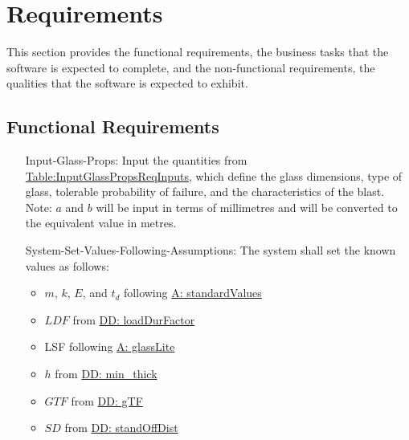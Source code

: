 \documentclass[12pt]{article}
\begin{document}
\section{Requirements}
\label{Sec:Requirements}
This section provides the functional requirements, the business tasks that the software is expected to complete, and the non-functional requirements, the qualities that the software is expected to exhibit.
\subsection{Functional Requirements}
\label{Sec:FRs}
\begin{itemize}
\item[Input-Glass-Props:\phantomsection\label{inputGlassProps}]Input the quantities from \hyperref[Table:InputGlassPropsReqInputs]{Table:InputGlassPropsReqInputs}, which define the glass dimensions, type of glass, tolerable probability of failure, and the characteristics of the blast. Note: $a$ and $b$ will be input in terms of millimetres and will be converted to the equivalent value in metres.
\item[System-Set-Values-Following-Assumptions:\phantomsection\label{sysSetValsFollowingAssumps}]The system shall set the known values as follows:
                                                                                                \begin{itemize}
                                                                                                \item{$m$, $k$, $E$, and ${t_{d}}$ following \hyperref[assumpSV]{A: standardValues}}
                                                                                                \item{$LDF$ from \hyperref[DD:loadDurFactor]{DD: loadDurFactor}}
                                                                                                \item{LSF following \hyperref[assumpGL]{A: glassLite}}
                                                                                                \item{$h$ from \hyperref[DD:min.thick]{DD: min\_thick}}
                                                                                                \item{$GTF$ from \hyperref[DD:gTF]{DD: gTF}}
                                                                                                \item{$SD$ from \hyperref[DD:standOffDist]{DD: standOffDist}}

\end{itemize}
\end{itemize}
\end{document}
